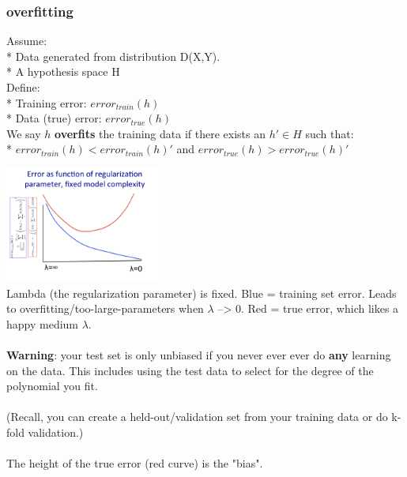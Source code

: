 \subsubsection{overfitting}
Assume: \hfill \\
* Data generated from distribution D(X,Y). \hfill \\
* A hypothesis space H \hfill \\
Define:  \hfill \\
* Training error: $error_{train}(h)$ \hfill \\
* Data (true) error: $error_{true}(h)$ \hfill \\
We say $h$ \textbf{overfits} the training data if there exists an $h' \in H$ such that:  \hfill \\ 
* $error_{train}(h) < error_{train}(h)'$ and $error_{true}(h) > error_{true}(h)'$

\includegraphics[width=2in]{figures/Error--vs_lambda--fixed_model_complexity.pdf}   \hfill \\
Lambda (the regularization parameter) is fixed.  Blue = training set error.  
Leads to overfitting/too-large-parameters when $\lambda$ --> 0. 
Red = true error, which likes a happy medium $\lambda$.  \hfill \\  \hfill \\

\textbf{Warning}: your test set is only unbiased if you never ever ever do \textbf{any} learning on the data. 
This includes using the test data to select for the degree of the polynomial you fit.   \hfill \\  \hfill \\
(Recall, you can create a held-out/validation set from your training data or do k-fold validation.)  \hfill \\
\hfill \\

The height of the true error (red curve) is the "bias".  \hfill \\

